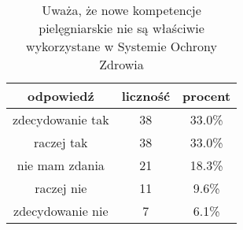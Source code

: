 \begin{table}[H]
\caption{Uważa, że nowe kompetencje pielęgniarskie nie są właściwie wykorzystane w Systemie Ochrony Zdrowia}
\centering
\begin{tabular}{ | c | c | c |}
\hline
odpowiedź & liczność & procent\\
\hline
zdecydowanie tak  &  38  & 33.0\% \\
\hline
raczej tak  &  38  & 33.0\% \\
\hline
nie mam zdania  &  21  & 18.3\% \\
\hline
raczej nie  &  11  & 9.6\% \\
\hline
zdecydowanie nie  &  7  & 6.1\% \\
\hline
\end{tabular}
\label{tab:Q21}
\end{table}

